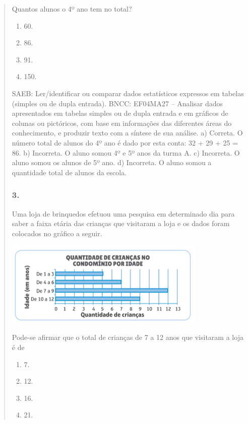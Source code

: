 \begin{enumerate}
\begin{escolha}
\begin{enumerate}
\begin{itemize}
\begin{itemize}
\begin{escolha}
\begin{quote}
\begin{escolha}
{Quantos alunos o 4º ano tem no total?

\begin{enumerate}
\def\labelenumi{\alph{enumi})}
\item
  60.
\item
  86.
\item
  91.
\item
  150.
\end{enumerate}

SAEB: Ler/identificar ou comparar dados estatísticos expressos em tabelas (simples ou de dupla entrada).
BNCC: EF04MA27 -- Analisar dados apresentados em tabelas simples ou de dupla entrada e em gráficos de
colunas ou pictóricos, com base em informações das diferentes áreas do conhecimento, e produzir
texto com a síntese de sua análise.
a)  Correta. O número total de alunos do 4º ano é dado por esta conta: 32 + 29 + 25 = 86.
b)  Incorreta. O aluno somou 4º e 5º anos da turma A.
c)  Incorreta. O aluno somou os alunos de 5º ano.
d)  Incorreta. O aluno somou a quantidade total de alunos da escola.

\subsubsection{3.}\label{section-103}

Uma loja de brinquedos efetuou uma pesquisa em determinado dia para
saber a faixa etária das crianças que visitaram a loja e os dados foram
colocados no gráfico a seguir.

\includegraphics[width=3.77564in,height=1.60972in]{media/image105.png}

Pode-se afirmar que o total de crianças
de 7 a 12 anos que visitaram a loja é de

\begin{enumerate}
\def\labelenumi{\alph{enumi})}
\item
  7.
\item
  12.
\item
  16.
\item
  21.
\end{enumerate}

}
\end{escolha}
\end{quote}
\end{escolha}
\end{itemize}
\end{itemize}
\end{enumerate}
\end{escolha}
\end{enumerate}

